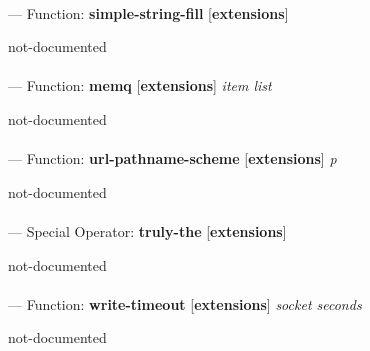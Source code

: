 \paragraph{}
\label{EXTENSIONS:SIMPLE-STRING-FILL}
--- Function: \textbf{simple-string-fill} [\textbf{extensions}] \textit{}

\begin{adjustwidth}{5em}{5em}
not-documented
\end{adjustwidth}

\paragraph{}
\label{EXTENSIONS:MEMQ}
--- Function: \textbf{memq} [\textbf{extensions}] \textit{item list}

\begin{adjustwidth}{5em}{5em}
not-documented
\end{adjustwidth}

\paragraph{}
\label{EXTENSIONS:URL-PATHNAME-SCHEME}
--- Function: \textbf{url-pathname-scheme} [\textbf{extensions}] \textit{p}

\begin{adjustwidth}{5em}{5em}
not-documented
\end{adjustwidth}

\paragraph{}
\label{EXTENSIONS:TRULY-THE}
--- Special Operator: \textbf{truly-the} [\textbf{extensions}] \textit{}

\begin{adjustwidth}{5em}{5em}
not-documented
\end{adjustwidth}

\paragraph{}
\label{EXTENSIONS:WRITE-TIMEOUT}
--- Function: \textbf{write-timeout} [\textbf{extensions}] \textit{socket seconds}

\begin{adjustwidth}{5em}{5em}
not-documented
\end{adjustwidth}

